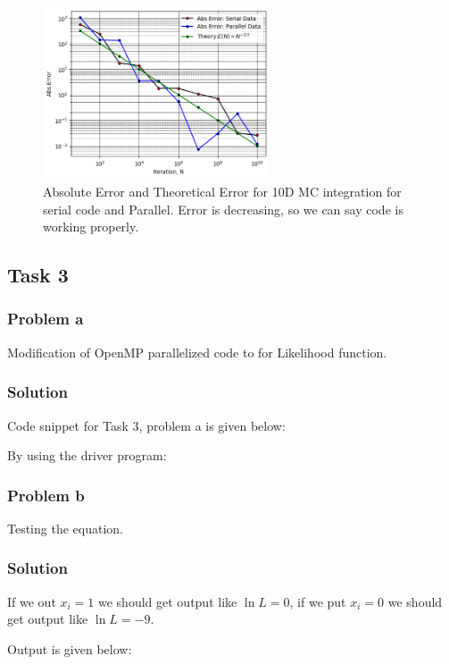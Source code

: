\documentclass{article}
\begin{document}
\begin{figure}[h!]
  \centering
    \includegraphics[width=0.6\textwidth]{Comparison_between_serial_and_parallel_1.png}
    \caption{Absolute Error and Theoretical Error for 10D MC integration for serial code and Parallel. Error is decreasing, so we can say code is working properly.} 
\end{figure}
\newpage
\subsection*{Task 3}
\subsubsection*{Problem a}
 Modification of OpenMP parallelized code to for Likelihood function.
\subsubsection*{Solution}
Code snippet for Task 3, problem a is given below:

By using the driver program:




\subsubsection*{Problem b}
Testing the equation.
\subsubsection*{Solution}
If we out $x_i = 1$ we should get output like $\ln L = 0$, if we put $x_i = 0$ we should get output like $\ln L = -9$.

Output is given below:

\end{document}
